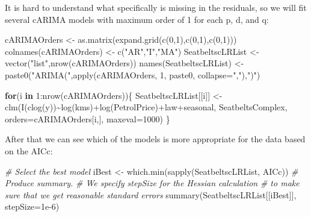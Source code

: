 \documentclass[
]{book}
\newenvironment{Shaded}{\begin{snugshade}}{\end{snugshade}}
\newcommand{\AttributeTok}[1]{\textcolor[rgb]{0.77,0.63,0.00}{#1}}
\newcommand{\CommentTok}[1]{\textcolor[rgb]{0.56,0.35,0.01}{\textit{#1}}}
\newcommand{\ControlFlowTok}[1]{\textcolor[rgb]{0.13,0.29,0.53}{\textbf{#1}}}
\newcommand{\DecValTok}[1]{\textcolor[rgb]{0.00,0.00,0.81}{#1}}
\newcommand{\FloatTok}[1]{\textcolor[rgb]{0.00,0.00,0.81}{#1}}
\newcommand{\FunctionTok}[1]{\textcolor[rgb]{0.00,0.00,0.00}{#1}}
\newcommand{\NormalTok}[1]{#1}
\newcommand{\OtherTok}[1]{\textcolor[rgb]{0.56,0.35,0.01}{#1}}
\newcommand{\SpecialCharTok}[1]{\textcolor[rgb]{0.00,0.00,0.00}{#1}}
\newcommand{\StringTok}[1]{\textcolor[rgb]{0.31,0.60,0.02}{#1}}
\begin{document}
It is hard to understand what specifically is missing in the residuals, so we will fit several cARIMA models with maximum order of 1 for each p, d, and q:

\begin{Shaded}
\begin{Highlighting}[]
\NormalTok{cARIMAOrders }\OtherTok{\textless{}{-}} \FunctionTok{as.matrix}\NormalTok{(}\FunctionTok{expand.grid}\NormalTok{(}\FunctionTok{c}\NormalTok{(}\DecValTok{0}\NormalTok{,}\DecValTok{1}\NormalTok{),}\FunctionTok{c}\NormalTok{(}\DecValTok{0}\NormalTok{,}\DecValTok{1}\NormalTok{),}\FunctionTok{c}\NormalTok{(}\DecValTok{0}\NormalTok{,}\DecValTok{1}\NormalTok{)))}
\FunctionTok{colnames}\NormalTok{(cARIMAOrders) }\OtherTok{\textless{}{-}} \FunctionTok{c}\NormalTok{(}\StringTok{"AR"}\NormalTok{,}\StringTok{"I"}\NormalTok{,}\StringTok{"MA"}\NormalTok{)}
\NormalTok{SeatbeltscLRList }\OtherTok{\textless{}{-}} \FunctionTok{vector}\NormalTok{(}\StringTok{"list"}\NormalTok{,}\FunctionTok{nrow}\NormalTok{(cARIMAOrders))}
\FunctionTok{names}\NormalTok{(SeatbeltscLRList) }\OtherTok{\textless{}{-}}
    \FunctionTok{paste0}\NormalTok{(}\StringTok{"ARIMA("}\NormalTok{,}\FunctionTok{apply}\NormalTok{(cARIMAOrders, }\DecValTok{1}\NormalTok{,}
\NormalTok{                          paste0, }\AttributeTok{collapse=}\StringTok{","}\NormalTok{),}\StringTok{")"}\NormalTok{)}

\ControlFlowTok{for}\NormalTok{(i }\ControlFlowTok{in} \DecValTok{1}\SpecialCharTok{:}\FunctionTok{nrow}\NormalTok{(cARIMAOrders))\{}
\NormalTok{    SeatbeltscLRList[[i]] }\OtherTok{\textless{}{-}}
        \FunctionTok{clm}\NormalTok{(}\FunctionTok{I}\NormalTok{(}\FunctionTok{clog}\NormalTok{(y))}\SpecialCharTok{\textasciitilde{}}\FunctionTok{log}\NormalTok{(kms)}\SpecialCharTok{+}\FunctionTok{log}\NormalTok{(PetrolPrice)}\SpecialCharTok{+}\NormalTok{law}\SpecialCharTok{+}\NormalTok{seasonal,}
\NormalTok{            SeatbeltsComplex, }\AttributeTok{orders=}\NormalTok{cARIMAOrders[i,],}
            \AttributeTok{maxeval=}\DecValTok{1000}\NormalTok{)}
\NormalTok{\}}
\end{Highlighting}
\end{Shaded}

After that we can see which of the models is more appropriate for the data based on the AICc:

\begin{Shaded}
\begin{Highlighting}[]
\CommentTok{\# Select the best model}
\NormalTok{iBest }\OtherTok{\textless{}{-}} \FunctionTok{which.min}\NormalTok{(}\FunctionTok{sapply}\NormalTok{(SeatbeltscLRList, AICc))}
\CommentTok{\# Produce summary.}
\CommentTok{\# We specify stepSize for the Hessian calculation}
\CommentTok{\# to make sure that we get reasonable standard errors}
\FunctionTok{summary}\NormalTok{(SeatbeltscLRList[[iBest]], }\AttributeTok{stepSize=}\FloatTok{1e{-}6}\NormalTok{)}
\end{Highlighting}
\end{Shaded}
\end{document}
